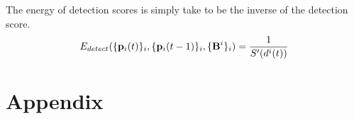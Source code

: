\documentclass[letterpaper]{report}
\begin{document}
The energy of detection scores is simply take to be the inverse of the detection score.
\begin{align}
  E_{detect}(\{ \mathbf{p}_{i}({t}) \}_i, \{ \mathbf{p}_{i}({t-1}) \}_i, \{\mathbf{B}^{i}\}_i ) = \frac{1}{S'(d^{i}(t))}
\end{align}

\chapter{Appendix}
\label{sec:appendix}


{\small
  
  
}
\end{document}
